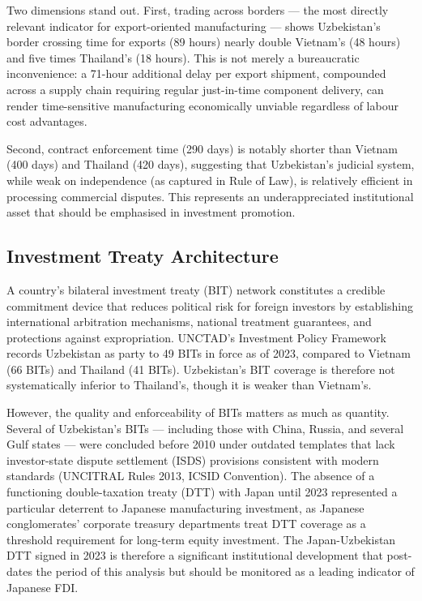 Two dimensions stand out. First, trading across borders --- the most directly relevant indicator for export-oriented manufacturing --- shows Uzbekistan's border crossing time for exports (89 hours) nearly double Vietnam's (48 hours) and five times Thailand's (18 hours). This is not merely a bureaucratic inconvenience: a 71-hour additional delay per export shipment, compounded across a supply chain requiring regular just-in-time component delivery, can render time-sensitive manufacturing economically unviable regardless of labour cost advantages.

Second, contract enforcement time (290 days) is notably shorter than Vietnam (400 days) and Thailand (420 days), suggesting that Uzbekistan's judicial system, while weak on independence (as captured in Rule of Law), is relatively efficient in processing commercial disputes. This represents an underappreciated institutional asset that should be emphasised in investment promotion.

\subsection{Investment Treaty Architecture}

A country's bilateral investment treaty (BIT) network constitutes a credible commitment device that reduces political risk for foreign investors by establishing international arbitration mechanisms, national treatment guarantees, and protections against expropriation. UNCTAD's Investment Policy Framework records Uzbekistan as party to 49 BITs in force as of 2023, compared to Vietnam (66 BITs) and Thailand (41 BITs). Uzbekistan's BIT coverage is therefore not systematically inferior to Thailand's, though it is weaker than Vietnam's.

However, the quality and enforceability of BITs matters as much as quantity. Several of Uzbekistan's BITs --- including those with China, Russia, and several Gulf states --- were concluded before 2010 under outdated templates that lack investor-state dispute settlement (ISDS) provisions consistent with modern standards (UNCITRAL Rules 2013, ICSID Convention). The absence of a functioning double-taxation treaty (DTT) with Japan until 2023 represented a particular deterrent to Japanese manufacturing investment, as Japanese conglomerates' corporate treasury departments treat DTT coverage as a threshold requirement for long-term equity investment. The Japan-Uzbekistan DTT signed in 2023 is therefore a significant institutional development that post-dates the period of this analysis but should be monitored as a leading indicator of Japanese FDI.

